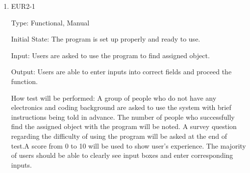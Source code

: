 \documentclass[12pt, titlepage]{article}
\begin{document}
\begin{enumerate}
\item{EUR2-1\\}

Type: Functional, Manual
					
Initial State: The program is set up properly and ready to use.
					
Input: Users are asked to use the program to find assigned object.
					
Output: Users are able to enter inputs into correct fields and proceed the function.
					
How test will be performed: A group of people who do not have any electronics and coding background are asked to use the system with brief instructions being told in advance. The number of people who successfully find the assigned object with the program will be noted. A survey question regarding the difficulty of using the program will be asked at the end of test.A score from 0 to 10 will be used to show user's experience. The majority of users should be able to clearly see input boxes and enter corresponding inputs.


\end{enumerate}
\end{document}

